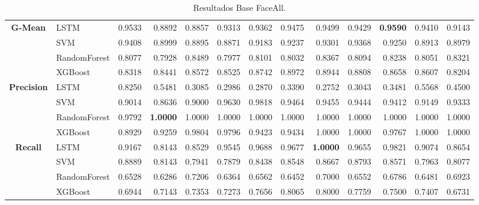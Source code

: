 \begin{table}[h]
\begin{adjustbox}{max width=15cm}
\begin{tabular}{|c|l|r|r|r|r|r|r|r|r|r|r|r|}
			\hline
			\textbf{G-Mean} & LSTM &  0.9533 &  0.8892 &  0.8857 &  0.9313 &  0.9362 &  0.9475 &  0.9499 &  0.9429 &  \textbf{0.9590} &  0.9410 &  0.9143 \\
			& SVM &  0.9408 &  0.8999 &  0.8895 &  0.8871 &  0.9183 &  0.9237 &  0.9301 &  0.9368 &  0.9250 &  0.8913 &  0.8979 \\
			& RandomForest &  0.8077 &  0.7928 &  0.8489 &  0.7977 &  0.8101 &  0.8032 &  0.8367 &  0.8094 &  0.8238 &  0.8051 &  0.8321 \\
			& XGBoost &  0.8318 &  0.8441 &  0.8572 &  0.8525 &  0.8742 &  0.8972 &  0.8944 &  0.8808 &  0.8658 &  0.8607 &  0.8204 \\
			\hline
			\textbf{Precision} & LSTM &  0.8250 &  0.5481 &  0.3085 &  0.2986 &  0.2870 &  0.3390 &  0.2752 &  0.3043 &  0.3481 &  0.5568 &  0.4500 \\
			& SVM &  0.9014 &  0.8636 &  0.9000 &  0.9630 &  0.9818 &  0.9464 &  0.9455 &  0.9444 &  0.9412 &  0.9149 &  0.9333 \\
			& RandomForest &  0.9792 &  \textbf{1.0000} &  1.0000 &  1.0000 &  1.0000 &  1.0000 &  1.0000 &  1.0000 &  1.0000 &  1.0000 &  1.0000 \\
			& XGBoost &  0.8929 &  0.9259 &  0.9804 &  0.9796 &  0.9423 &  0.9434 &  1.0000 &  1.0000 &  0.9767 &  1.0000 &  1.0000 \\
			\hline
			\textbf{Recall} & LSTM &  0.9167 &  0.8143 &  0.8529 &  0.9545 &  0.9688 &  0.9677 &  \textbf{1.0000} &  0.9655 &  0.9821 &  0.9074 &  0.8654 \\
			& SVM &  0.8889 &  0.8143 &  0.7941 &  0.7879 &  0.8438 &  0.8548 &  0.8667 &  0.8793 &  0.8571 &  0.7963 &  0.8077 \\
			& RandomForest &  0.6528 &  0.6286 &  0.7206 &  0.6364 &  0.6562 &  0.6452 &  0.7000 &  0.6552 &  0.6786 &  0.6481 &  0.6923 \\
			& XGBoost &  0.6944 &  0.7143 &  0.7353 &  0.7273 &  0.7656 &  0.8065 &  0.8000 &  0.7759 &  0.7500 &  0.7407 &  0.6731 \\
			\hline
		\end{tabular}
	\end{adjustbox}
	\caption{Resultados Base FaceAll.}
	\label{tab:faceAllBase}
\end{table}

